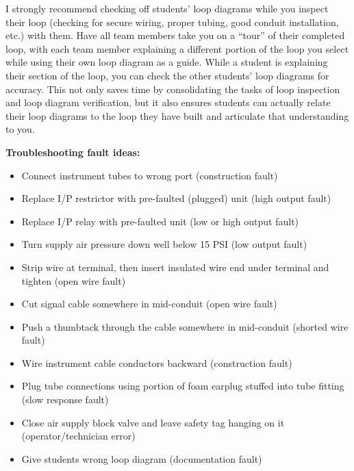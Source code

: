 I strongly recommend checking off students' loop diagrams while you inspect their loop (checking for secure wiring, proper tubing, good conduit installation, etc.) with them.  Have all team members take you on a ``tour'' of their completed loop, with each team member explaining a different portion of the loop you select while using their own loop diagram as a guide.  While a student is explaining their section of the loop, you can check the other students' loop diagrams for accuracy.  This not only saves time by consolidating the tasks of loop inspection and loop diagram verification, but it also ensures students can actually relate their loop diagrams to the loop they have built and articulate that understanding to you.

\vskip 10pt

\goodbreak

{\bf Troubleshooting fault ideas:}

\begin{itemize}
\goodbreak
\item Connect instrument tubes to wrong port (construction fault)
\item Replace I/P restrictor with pre-faulted (plugged) unit (high output fault)
\item Replace I/P relay with pre-faulted unit (low or high output fault)
\item Turn supply air pressure down well below 15 PSI (low output fault)
\item Strip wire at terminal, then insert insulated wire end under terminal and tighten (open wire fault)
\item Cut signal cable somewhere in mid-conduit (open wire fault)
\item Push a thumbtack through the cable somewhere in mid-conduit (shorted wire fault)
\item Wire instrument cable conductors backward (construction fault)
\item Plug tube connections using portion of foam earplug stuffed into tube fitting (slow response fault)
\item Close air supply block valve and leave safety tag hanging on it (operator/technician error)
\item Give students wrong loop diagram (documentation fault)
\end{itemize}















